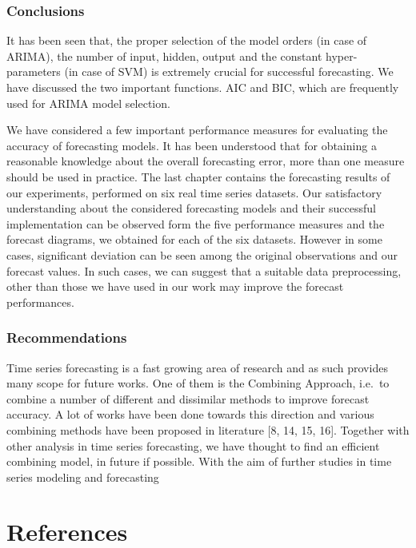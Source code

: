 \documentclass[12pt,a4paper]{book}
\begin{document}
{{\subsection{Conclusions}\label{conclusions}}

It has been seen that, the proper selection of the model orders (in case
of ARIMA), the number of input, hidden, output and the constant
hyper-parameters (in case of SVM) is extremely crucial for successful
forecasting. We have discussed the two important functions. AIC and BIC,
which are frequently used for ARIMA model selection.

We have considered a few important performance measures for evaluating
the accuracy of forecasting models. It has been understood that for
obtaining a reasonable knowledge about the overall forecasting error,
more than one measure should be used in practice. The last chapter
contains the forecasting results of our experiments, performed on six
real time series datasets. Our satisfactory understanding about the
considered forecasting models and their successful implementation can be
observed form the five performance measures and the forecast diagrams,
we obtained for each of the six datasets. However in some cases,
significant deviation can be seen among the original observations and
our forecast values. In such cases, we can suggest that a suitable data
preprocessing, other than those we have used in our work may improve the
forecast performances.

\hypertarget{recommendations}{%
\subsection{Recommendations}\label{recommendations}}

Time series forecasting is a fast growing area of research and as such
provides many scope for future works. One of them is the Combining
Approach, i.e.~to combine a number of different and dissimilar methods
to improve forecast accuracy. A lot of works have been done towards this
direction and various combining methods have been proposed in literature
{[}8, 14, 15, 16{]}. Together with other analysis in time series
forecasting, we have thought to find an efficient combining model, in
future if possible. With the aim of further studies in time series
modeling and forecasting

\hypertarget{references}{%
\chapter*{References}\label{references}}

}
\end{document}

